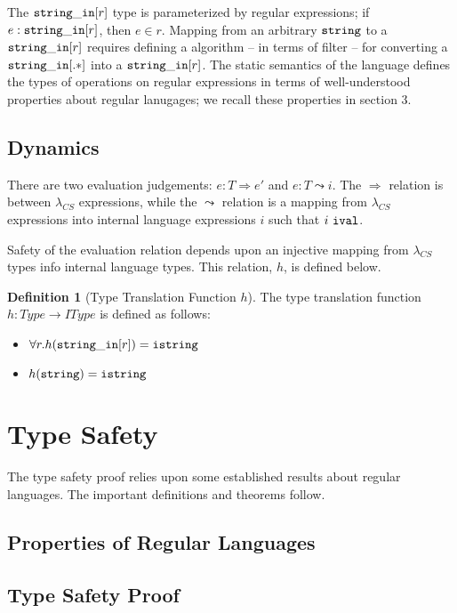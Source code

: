 \documentclass[10pt,preprint]{sigplanconf}
\theoremstyle{definition}
\newtheorem{defn}[thm]{Definition}
\newcommand{\strin}{{\tt string\_in}}
\newcommand{\str}{ {\tt string} }
\newcommand{\istr}{ {\tt istring} }
\newcommand{\reduces}{ \Rightarrow }
\newcommand{\ireduces}{ \leadsto }
\newcommand{\ival}{ \ {\tt ival} }
\newcommand{\lcs}{\lambda_{CS}}
\begin{document}
The $\strin[r]$ type is parameterized by regular expressions; if $e:\strin[r]$,
then $e \in r$. Mapping from an arbitrary $\str$ to a $\strin[r]$ requires
defining a algorithm -- in terms of filter -- for converting a $\strin[.*]$
into a $\strin[r]$. The static semantics of the language defines the types of
operations on regular expressions in terms of well-understood properties about
regular lanugages; we recall these properties in section 3.

\subsection{Dynamics}

There are two evaluation judgements: $e:T \reduces e'$ and $e:T \ireduces i$.
The $\reduces$ relation is between $\lcs$ expressions, while the $\ireduces$
relation is a mapping from $\lcs$ expressions into internal language expressions
$i$ such that $i \ival$.

Safety of the evaluation relation depends upon an injective mapping from $\lcs$ types info
internal language types. This relation, $h$, is defined below.

\begin{defn}[Type Translation Function $h$]
  The type translation function $h : Type \rightarrow IType$ is defined as follows:
  \begin{itemize}
    \item $\forall r. h(\strin[r]) = \istr$
    \item $h(\str) = \istr$
  \end{itemize}
\end{defn}

\section{Type Safety}

The type safety proof relies upon some established results about regular languages.
The important definitions and theorems follow.

\subsection{Properties of Regular Languages}

\subsection{Type Safety Proof}
\end{document}
